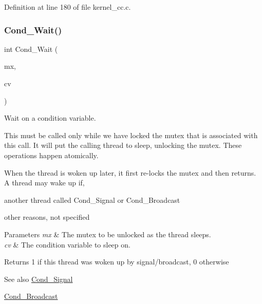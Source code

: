 Definition at line 180 of file kernel\+\_\+cc.\+c.

\mbox{\label{group__syscalls_ga970dca2210b3f2ec8aedab7f542a9bf4}} 
\subsubsection{\texorpdfstring{Cond\+\_\+\+Wait()}{Cond\_Wait()}}
{\footnotesize\ttfamily int Cond\+\_\+\+Wait (\begin{DoxyParamCaption}\item[{\hyperlink{group__syscalls_gaef2ec62cae8e0031fd19fc8b91083ade}{Mutex} $\ast$}]{mx,  }\item[{\hyperlink{structCondVar}{Cond\+Var} $\ast$}]{cv }\end{DoxyParamCaption})}



Wait on a condition variable. 

This must be called only while we have locked the mutex that is associated with this call. It will put the calling thread to sleep, unlocking the mutex. These operations happen atomically.

When the thread is woken up later, it first re-\/locks the mutex and then returns. A thread may wake up if,
\begin{DoxyItemize}
\item another thread called {\ttfamily Cond\+\_\+\+Signal} or {\ttfamily Cond\+\_\+\+Broadcast} 
\item other reasons, not specified
\end{DoxyItemize}


\begin{DoxyParams}{Parameters}
{\em mx} & The mutex to be unlocked as the thread sleeps. \\
\hline
{\em cv} & The condition variable to sleep on. \\
\hline
\end{DoxyParams}
\begin{DoxyReturn}{Returns}
1 if this thread was woken up by signal/broadcast, 0 otherwise 
\end{DoxyReturn}
\begin{DoxySeeAlso}{See also}
\hyperlink{group__syscalls_ga43f64f8be273d2fe77d7de5f4b81e22d}{Cond\+\_\+\+Signal} 

\hyperlink{group__syscalls_ga8196aa2a48cad90742f254cc3b8fd351}{Cond\+\_\+\+Broadcast} 
\end{DoxySeeAlso}


